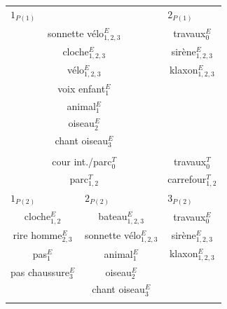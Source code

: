 \begin{table}[t]
\centering
\tiny 
\begin{tabular}{c|c|c|c|c|c|c}
\multicolumn{3}{l|}{$1_{P(1)}$} & \multicolumn{4}{l}{$2_{P(1)}$} \\
\multicolumn{3}{c|}{sonnette vélo$_{1,2,3}^E$} & \multicolumn{4}{c}{travaux$_0^E$} \\
\multicolumn{3}{c|}{cloche$_{1,2,3}^E$}        & \multicolumn{4}{c}{sirène$_{1,2,3}^E$} \\
\multicolumn{3}{c|}{vélo$_{1,2,3}^E$}          & \multicolumn{4}{c}{klaxon$_{1,2,3}^E$} \\
\multicolumn{3}{c|}{voix enfant$_1^E$}         & \multicolumn{4}{c}{} \\
\multicolumn{3}{c|}{animal$_1^E$}              & \multicolumn{4}{c}{} \\          
\multicolumn{3}{c|}{oiseau$_2^E$}              & \multicolumn{4}{c}{} \\             
\multicolumn{3}{c|}{chant oiseau$_3^E$}        & \multicolumn{4}{c}{} \\  
\multicolumn{3}{c|}{}                          & \multicolumn{4}{c}{} \\
\multicolumn{3}{c|}{cour int./parc$_0^T$}      & \multicolumn{4}{c}{travaux$_0^T$} \\                                                                     
\multicolumn{3}{c|}{parc$_{1,2}^T$}            & \multicolumn{4}{c}{carrefour$_{1,2}^T$} \\                                                                                           
\hline
\multicolumn{2}{l|}{$1_{P(2)}$} & \multicolumn{1}{l|}{$2_{P(2)}$}      & \multicolumn{4}{l}{$3_{P(2)}$} \\
\multicolumn{2}{c|}{cloche$_{1,2}^E$}      & bateau$_{1,2,3}^E$        & \multicolumn{4}{c}{travaux$_0^E$} \\
\multicolumn{2}{c|}{rire homme$_{2,3}^E$}  & sonnette vélo$_{1,2,3}^E$ & \multicolumn{4}{c}{sirène$_{1,2,3}^E$} \\
\multicolumn{2}{c|}{pas$_{1}^E$}           & animal$_{1}^E$            & \multicolumn{4}{c}{klaxon$_{1,2,3}^E$} \\
\multicolumn{2}{c|}{pas chaussure$_{3}^E$} & oiseau$_2^E$              & \multicolumn{4}{c}{} \\	
\multicolumn{2}{c|}{}                      & chant oiseau$_3^E$        & \multicolumn{4}{c}{} \\	
\multicolumn{2}{c|}{}                      &                           & \multicolumn{4}{c}{} \\		

\end{tabular}
\end{table}
